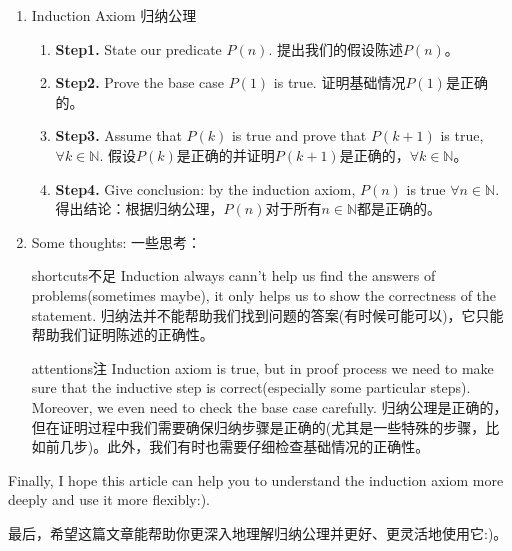 \documentclass{Math_Note}
\begin{document}
\begin{enumerate}
    \item Induction Axiom 归纳公理
    \begin{enumerate}
        \item \textbf{Step1.} State our predicate $P(n)$. 提出我们的假设陈述$P(n)$。
        \item \textbf{Step2.} Prove the base case $P(1)$ is true. 证明基础情况$P(1)$是正确的。
        \item \textbf{Step3.} Assume that $P(k)$ is true and prove that $P(k+1)$ is true, $\forall k \in \mathbb{N}$. 假设$P(k)$是正确的并证明$P(k+1)$是正确的，$\forall k \in \mathbb{N}$。
        \item \textbf{Step4.} Give conclusion: by the induction axiom, $P(n)$ is true $\forall n \in \mathbb{N}$. 得出结论：根据归纳公理，$P(n)$对于所有$n \in \mathbb{N}$都是正确的。
    \end{enumerate}
    \item Some thoughts: 一些思考：
    \item [shortcuts不足]Induction always cann't help us find the answers of problems(sometimes maybe), it only helps us to show the correctness of the statement. 归纳法并不能帮助我们找到问题的答案(有时候可能可以)，它只能帮助我们证明陈述的正确性。
    \item [attentions注]Induction axiom is true, but in proof process we need to make sure that the inductive step is correct(especially some particular steps). Moreover, we even need to check the base case carefully. 归纳公理是正确的，但在证明过程中我们需要确保归纳步骤是正确的(尤其是一些特殊的步骤，比如前几步)。此外，我们有时也需要仔细检查基础情况的正确性。
\end{enumerate}

Finally, I hope this article can help you to understand the induction axiom more deeply and use it more flexibly:).

最后，希望这篇文章能帮助你更深入地理解归纳公理并更好、更灵活地使用它:)。
\end{document}
